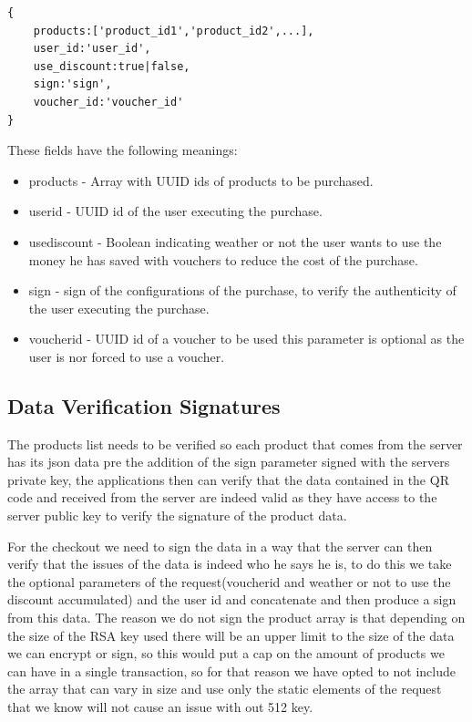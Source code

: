 \documentclass[12pt]{article}
\begin{document}
\begin{verbatim}
{
	products:['product_id1','product_id2',...],
	user_id:'user_id',
	use_discount:true|false,
	sign:'sign',
	voucher_id:'voucher_id'
}
\end{verbatim}

These fields have the following meanings:
\begin{itemize}
	\item products - Array with UUID ids of products to be purchased.
	\item user\textunderscore id - UUID id of the user executing the purchase.
	\item use\textunderscore discount - Boolean indicating weather or not the user wants to use the money he has saved with vouchers to reduce the cost of the purchase.
	\item sign - sign of the configurations of the purchase, to verify the authenticity of the user executing the purchase.
	\item voucher\textunderscore id - UUID id of a voucher to be used this parameter is optional as the user is nor forced to use a voucher.
\end{itemize}

\subsection{Data Verification Signatures}
\hspace{0.6cm}
The products list needs to be verified so each product that comes from the server has its json data pre the addition of the sign parameter signed with the servers
private key, the applications then can verify that the data contained in the QR code and received from the server are indeed valid as they have access to the server
public key to verify the signature of the product data.

For the checkout we need to sign the data in a way that the server can then verify that the issues of the data is indeed who he says he is, to do this we take the
optional parameters of the request(voucher\textunderscore id and weather or not to use the discount accumulated) and the user id and concatenate and then produce a sign from this
data. The reason we do not sign the product array is that depending on the size of the RSA key used there will be an upper limit to the size of the data we can
encrypt or sign, so this would put a cap on the amount of products we can have in a single transaction, so for that reason we have opted to not include the array
that can vary in size and use only the static elements of the request that we know will not cause an issue with out 512 key.
\end{document}
